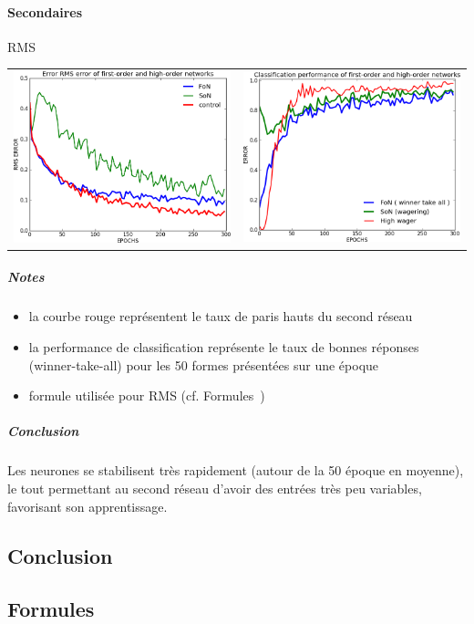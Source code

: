     \paragraph{Secondaires}
      RMS
      \begin{center}
	\begin{tabular}{lr}
	  \hspace*{-1cm}
	  \includegraphics[width=250px]{data/expD3/rms.png}
	  &
	  \includegraphics[width=250px]{data/expD3/perf.png} 
	\end{tabular}
      \end{center} 
      \subparagraph{Notes}
	\begin{itemize}
	  \item la courbe rouge représentent le taux de paris hauts du second réseau
	  \item la performance de classification représente le taux de bonnes réponses (winner-take-all) pour les 50 formes présentées sur une époque
	  \item formule utilisée pour RMS (cf. Formules~)
	\end{itemize}
      \subparagraph{Conclusion}
	Les neurones se stabilisent très rapidement (autour de la 50 époque en moyenne), 
	le tout permettant au second réseau d'avoir des entrées très peu variables, favorisant
	son apprentissage.


  \subsection{Conclusion}
  
  

  \newpage 
  \subsection{Formules}
    
    
    
    


